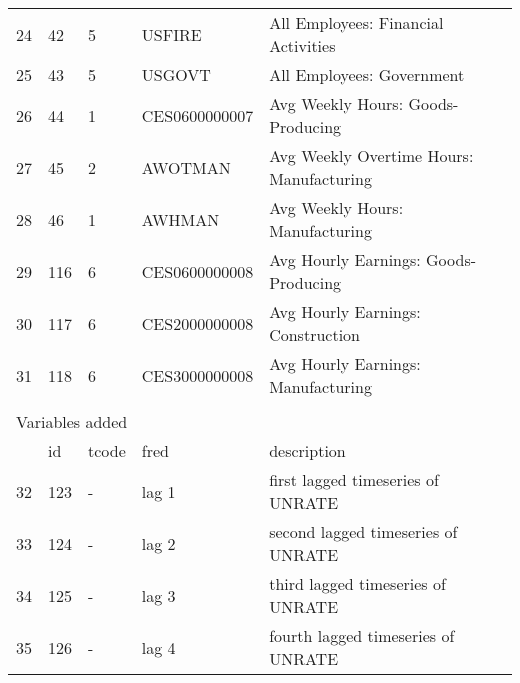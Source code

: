 \begin{table}[ht]
\begin{tabular}{lllll}
24 & 42 & 5 & USFIRE & All Employees: Financial Activities \\
25 & 43 & 5 & USGOVT & All Employees: Government \\
26 & 44 & 1 & CES0600000007 & Avg Weekly Hours: Goods-Producing \\
27 & 45 & 2 & AWOTMAN & Avg Weekly Overtime Hours: Manufacturing \\
28 & 46 & 1 & AWHMAN & Avg Weekly Hours: Manufacturing \\
29 & 116 & 6 & CES0600000008 & Avg Hourly Earnings: Goods-Producing \\
30 & 117 & 6 & CES2000000008 & Avg Hourly Earnings: Construction \\
31 & 118 & 6 & CES3000000008 & Avg Hourly Earnings: Manufacturing \\
\hline \\
\multicolumn{5}{l}{Variables added} \\
\toprule
& id & tcode & fred & description \\
\midrule
32 & 123 & - & lag 1 & first lagged timeseries of UNRATE \\
33 & 124 & - & lag 2 & second lagged timeseries of UNRATE \\
34 & 125 & - & lag 3 & third lagged timeseries of UNRATE \\
35 & 126 & - & lag 4&  fourth lagged timeseries of UNRATE \\
\bottomrule
\end{tabular}  
\end{table} 